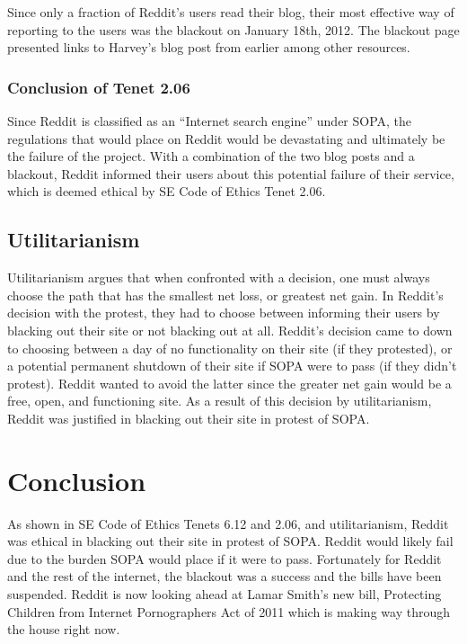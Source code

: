 \documentclass[11pt]{article}
\begin{document}
\begin{multicols}{2}
Since only a fraction of Reddit's users read their blog, their most effective way of reporting to the users was the blackout on January 18th, 2012. The blackout page presented links to Harvey's blog post from earlier among other resources.\cite{reddit-blackout-blog} 

   \subsubsection{Conclusion of Tenet 2.06}

Since Reddit is classified as an ``Internet search engine'' under SOPA, the regulations that would place on Reddit would be devastating and ultimately be the failure of the project. With a combination of the two blog posts and a blackout, Reddit informed their users about this potential failure of their service, which is deemed ethical by SE Code of Ethics Tenet 2.06. 

   \subsection{Utilitarianism}

   Utilitarianism argues that when confronted with a decision, one must always choose the path that has the smallest net loss, or greatest net gain.\cite{utilitarianism} In Reddit's decision with the protest, they had to choose between informing their users by blacking out their site or not blacking out at all. Reddit's decision came to down to choosing between a day of no functionality on their site (if they protested), or a potential permanent shutdown of their site if SOPA were to pass (if they didn't protest). Reddit wanted to avoid the latter since the greater net gain would be a free, open, and functioning site. As a result of this decision by utilitarianism, Reddit was justified in blacking out their site in protest of SOPA.


   \section{Conclusion}

   As shown in SE Code of Ethics Tenets 6.12 and 2.06, and utilitarianism, Reddit was ethical in blacking out their site in protest of SOPA. Reddit would likely fail due to the burden SOPA would place if it were to pass. Fortunately for Reddit and the rest of the internet, the blackout was a success and the bills have been suspended.\cite{senators-change-position} Reddit is now looking ahead at Lamar Smith's new bill, Protecting Children from Internet Pornographers Act of 2011 which is making way through the house right now.\cite{child-porn}


\end{multicols}
\end{document}
